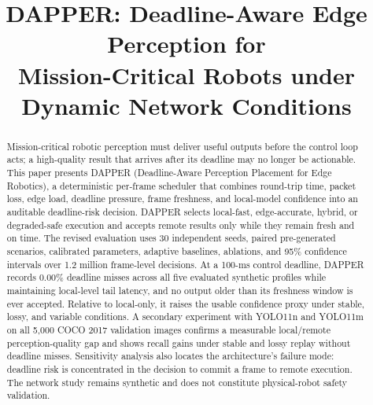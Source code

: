\documentclass[conference,a4paper]{IEEEtran}
\begin{document}
\title{DAPPER: Deadline-Aware Edge Perception for\\Mission-Critical Robots under Dynamic Network Conditions}

\author{%
\and
{}
}

\maketitle

\begin{abstract}
Mission-critical robotic perception must deliver useful outputs before the control loop acts; a high-quality result that arrives after its deadline may no longer be actionable. This paper presents DAPPER (Deadline-Aware Perception Placement for Edge Robotics), a deterministic per-frame scheduler that combines round-trip time, packet loss, edge load, deadline pressure, frame freshness, and local-model confidence into an auditable deadline-risk decision. DAPPER selects local-fast, edge-accurate, hybrid, or degraded-safe execution and accepts remote results only while they remain fresh and on time. The revised evaluation uses 30 independent seeds, paired pre-generated scenarios, calibrated parameters, adaptive baselines, ablations, and 95\% confidence intervals over 1.2 million frame-level decisions. At a 100-ms control deadline, DAPPER records 0.00\% deadline misses across all five evaluated synthetic profiles while maintaining local-level tail latency, and no output older than its freshness window is ever accepted. Relative to local-only, it raises the usable confidence proxy under stable, lossy, and variable conditions. A secondary experiment with YOLO11n and YOLO11m on all 5,000 COCO 2017 validation images confirms a measurable local/remote perception-quality gap and shows recall gains under stable and lossy replay without deadline misses. Sensitivity analysis also locates the architecture's failure mode: deadline risk is concentrated in the decision to commit a frame to remote execution. The network study remains synthetic and does not constitute physical-robot safety validation.
\end{abstract}
\end{document}
